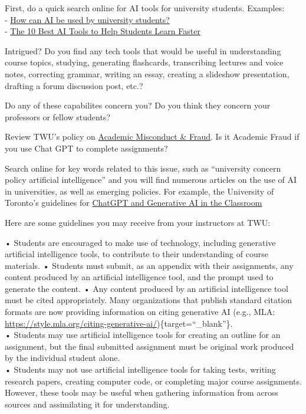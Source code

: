 \documentclass[
]{book}
\theoremstyle{definition}
\theoremstyle{definition}
\theoremstyle{definition}
\theoremstyle{definition}
\theoremstyle{remark}
\begin{document}
\begin{reflect}
First, do a quick search online for AI tools for university students.
Examples:\\
- \href{https://www.timeshighereducation.com/student/advice/how-can-ai-be-used-university-students}{How can AI be used by university students?}\\
- \href{https://mystudylife.com/10-best-ai-tools-to-help-students-learn-faster/}{The 10 Best AI Tools to Help Students Learn Faster}

Intrigued? Do you find any tech tools that would be useful in understanding course topics, studying, generating flashcards, transcribing lectures and voice notes, correcting grammar, writing an essay, creating a slideshow presentation, drafting a forum discussion post, etc.?

Do any of these capabilites concern you? Do you think they concern your professors or fellow students?

Review TWU's policy on \href{https://www.twu.ca/about-us/policies-guidelines/university-policies/academic-misconduct-fraud}{Academic Misconduct \& Fraud}. Is it Academic Fraud if you use Chat GPT to complete assignments?

Search online for key words related to this issue, such as ``university concern policy artificial intelligence'' and you will find numerous articles on the use of AI in universities, as well as emerging policies. For example, the University of Toronto's guidelines for \href{https://www.viceprovostundergrad.utoronto.ca/strategic-priorities/digital-learning/special-initiative-artificial-intelligence/}{ChatGPT and Generative AI in the Classroom}

Here are some guidelines you may receive from your instructors at TWU:

• Students are encouraged to make use of technology, including generative artificial intelligence
tools, to contribute to their understanding of course materials.
• Students must submit, as an appendix with their assignments, any content produced by an
artificial intelligence tool, and the prompt used to generate the content.
• Any content produced by an artificial intelligence tool must be cited appropriately. Many
organizations that publish standard citation formats are now providing information on citing
generative AI (e.g., MLA: \url{https://style.mla.org/citing-generative-ai/})\{target=``\_blank''\}.\\
• Students may use artificial intelligence tools for creating an outline for an assignment, but the
final submitted assignment must be original work produced by the individual student alone.\\
• Students may not use artificial intelligence tools for taking tests, writing research papers,
creating computer code, or completing major course assignments. However, these tools may be
useful when gathering information from across sources and assimilating it for understanding.


\end{reflect}
\end{document}
